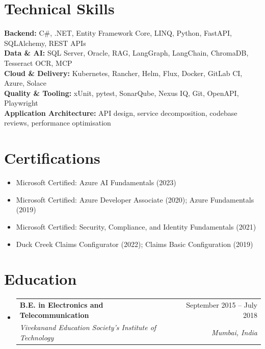 \documentclass[letterpaper,11pt]{article}
\makeatletter
\newcommand{\resumeSubheading}[4]{
  \vspace{-2pt}\item
    \begin{tabular*}{0.97\textwidth}[t]{l@{\extracolsep{\fill}}r}
      \textbf{#1} & #2 \\
      \textit{\small#3} & \textit{\small #4} \\
    \end{tabular*}\vspace{-7pt}
}
\newcommand{\resumeSubHeadingListStart}{\begin{itemize}[leftmargin=0.15in, label={}]}
\newcommand{\resumeSubHeadingListEnd}{\end{itemize}}
\makeatother
\begin{document}
\section{Technical Skills}
\begin{itemize}[leftmargin=0.15in, label={}]
  \small{\item{
    \textbf{Backend:} C\#, .NET, Entity Framework Core, LINQ, Python, FastAPI, SQLAlchemy, REST APIs \\
    \textbf{Data \& AI:} SQL Server, Oracle, RAG, LangGraph, LangChain, ChromaDB, Tesseract OCR, MCP \\
    \textbf{Cloud \& Delivery:} Kubernetes, Rancher, Helm, Flux, Docker, GitLab CI, Azure, Solace \\
    \textbf{Quality \& Tooling:} xUnit, pytest, SonarQube, Nexus IQ, Git, OpenAPI, Playwright \\
    \textbf{Application Architecture:} API design, service decomposition, codebase reviews, performance optimisation
  }}
\end{itemize}

\section{Certifications}
\begin{itemize}[leftmargin=0.15in, label={}, itemsep=2pt]
  \small
  \item Microsoft Certified: Azure AI Fundamentals (2023)
  \item Microsoft Certified: Azure Developer Associate (2020); Azure Fundamentals (2019)
  \item Microsoft Certified: Security, Compliance, and Identity Fundamentals (2021)
  \item Duck Creek Claims Configurator (2022); Claims Basic Configuration (2019)
\end{itemize}

\section{Education}
\resumeSubHeadingListStart
  \resumeSubheading
    {B.E. in Electronics and Telecommunication}{September 2015 -- July 2018}
    {Vivekanand Education Society's Institute of Technology}{Mumbai, India}
\resumeSubHeadingListEnd
\end{document}
